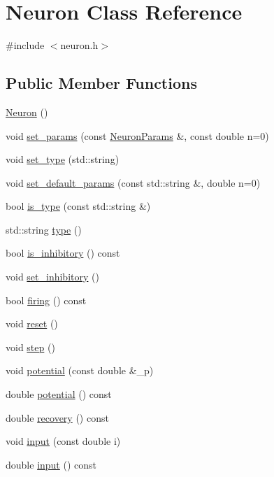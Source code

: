 \hypertarget{classNeuron}{}\section{Neuron Class Reference}
\label{classNeuron}


{\ttfamily \#include $<$neuron.\+h$>$}

\subsection*{Public Member Functions}
\begin{DoxyCompactItemize}
\item 
\hyperlink{classNeuron_a823487d01615fadb8ac19a2768dd9d96}{Neuron} ()
\item 
void \hyperlink{classNeuron_a85049e5f8745c53867178dd1cf6e51e3}{set\+\_\+params} (const \hyperlink{structNeuronParams}{Neuron\+Params} \&, const double n=0)
\item 
void \hyperlink{classNeuron_a533359bca915ef99c96e50d4bfff58b2}{set\+\_\+type} (std\+::string)
\item 
void \hyperlink{classNeuron_a0759d03a357708ee4174f1bbb2b0b8d7}{set\+\_\+default\+\_\+params} (const std\+::string \&, double n=0)
\item 
bool \hyperlink{classNeuron_a37459ba1dc4b0060707c33bf2ad5b10d}{is\+\_\+type} (const std\+::string \&)
\item 
std\+::string \hyperlink{classNeuron_abcf0b4ecd00cba630bfd2e764a61b5ee}{type} ()
\item 
bool \hyperlink{classNeuron_a649c6080b0749e6e642bf9df8f191d2d}{is\+\_\+inhibitory} () const
\item 
void \hyperlink{classNeuron_aa1481c474df55ad14373e51c6bb0f6fd}{set\+\_\+inhibitory} ()
\item 
bool \hyperlink{classNeuron_a4f477ebb623a7681c0f09dbfc4608a0d}{firing} () const
\item 
void \hyperlink{classNeuron_a6817fc5bf2128150b41b65e74f018408}{reset} ()
\item 
void \hyperlink{classNeuron_a224d5cead5f94bbe15ae49774db3e174}{step} ()
\item 
void \hyperlink{classNeuron_a47ea1a8f25dd62a34c9e0bdc0b7ae7fb}{potential} (const double \&\+\_\+p)
\item 
double \hyperlink{classNeuron_aab6607e17778ff1b4c05610c935b3156}{potential} () const
\item 
double \hyperlink{classNeuron_a2e84bc427827092295070dec404886f4}{recovery} () const
\item 
void \hyperlink{classNeuron_ab6b4f1a9633eaae9967cc6b226eed5fa}{input} (const double i)
\item 
double \hyperlink{classNeuron_ac00c31820b58e9c6f909db6a12e58b34}{input} () const
\end{DoxyCompactItemize}
